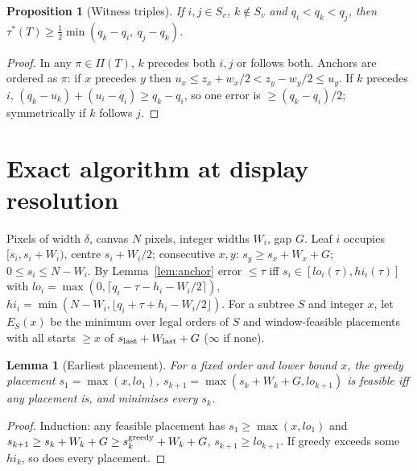 \documentclass[11pt]{article}
\newtheorem{lemma}{Lemma}\newtheorem{proposition}{Proposition}\newtheorem{theorem}{Theorem}\newtheorem{corollary}{Corollary}
\theoremstyle{remark}\newtheorem{remark}{Remark}
\begin{document}
\begin{proposition}[Witness triples]\label{prop:witness}
If $i,j\in S_v$, $k\notin S_v$ and $q_i<q_k<q_j$, then $\tau^*(T)\ge\tfrac12\min(q_k-q_i,\ q_j-q_k)$.
\end{proposition}
\begin{proof}In any $\pi\in\Pi(T)$, $k$ precedes both $i,j$ or follows both. Anchors are ordered as $\pi$: if $x$ precedes $y$ then $u_x\le z_x+w_x/2<z_y-w_y/2\le u_y$. If $k$ precedes $i$, $(q_k-u_k)+(u_i-q_i)\ge q_k-q_i$, so one error is $\ge(q_k-q_i)/2$; symmetrically if $k$ follows $j$.\end{proof}

\section{Exact algorithm at display resolution}
Pixels of width $\delta$, canvas $N$ pixels, integer widths $W_i$, gap $G$. Leaf $i$ occupies $[s_i,s_i+W_i)$, centre $s_i+W_i/2$; consecutive $x,y$: $s_y\ge s_x+W_x+G$; $0\le s_i\le N-W_i$. By Lemma~\ref{lem:anchor} error $\le\tau$ iff $s_i\in[lo_i(\tau),hi_i(\tau)]$ with $lo_i=\max(0,\lceil q_i-\tau-h_i-W_i/2\rceil)$, $hi_i=\min(N-W_i,\lfloor q_i+\tau+h_i-W_i/2\rfloor)$.
For a subtree $S$ and integer $x$, let $E_S(x)$ be the minimum over legal orders of $S$ and window-feasible placements with all starts $\ge x$ of $s_{\rm last}+W_{\rm last}+G$ ($\infty$ if none).

\begin{lemma}[Earliest placement]\label{lem:greedy}For a fixed order and lower bound $x$, the greedy placement $s_1=\max(x,lo_1)$, $s_{k+1}=\max(s_k+W_k+G,lo_{k+1})$ is feasible iff any placement is, and minimises every $s_k$.\end{lemma}
\begin{proof}Induction: any feasible placement has $s_1\ge\max(x,lo_1)$ and $s_{k+1}\ge s_k+W_k+G\ge s_k^{\rm greedy}+W_k+G$, $s_{k+1}\ge lo_{k+1}$. If greedy exceeds some $hi_k$, so does every placement.\end{proof}
\end{document}
